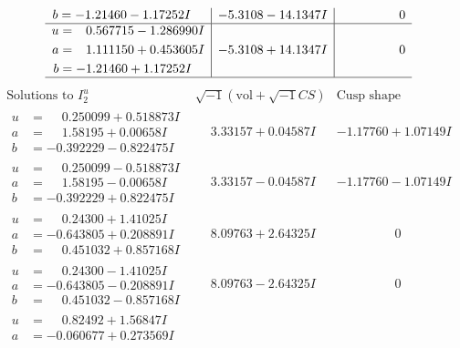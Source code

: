 \documentclass[1p]{elsarticle_modified}
\theoremstyle{definition}
\newcommand{\I}{\sqrt{-1}}
\begin{document}
$$\begin{array}{c|c|c}
\begin{aligned}
b &= -1.21460 - 1.17252 I\end{aligned}
 & -5.3108 - 14.1347 I & \phantom{-0.000000 } 0 \\ \hline\begin{aligned}
u &= \phantom{-}0.567715 - 1.286990 I \\
a &= \phantom{-}1.111150 + 0.453605 I \\
b &= -1.21460 + 1.17252 I\end{aligned}
 & -5.3108 + 14.1347 I & \phantom{-0.000000 } 0\\
 \hline 
 \end{array}$$\newpage$$\begin{array}{c|c|c}  
\text{Solutions to }I^u_{2}& \I (\text{vol} + \sqrt{-1}CS) & \text{Cusp shape}\\
 \hline 
\begin{aligned}
u &= \phantom{-}0.250099 + 0.518873 I \\
a &= \phantom{-}1.58195 + 0.00658 I \\
b &= -0.392229 - 0.822475 I\end{aligned}
 & \phantom{-}3.33157 + 0.04587 I & -1.17760 + 1.07149 I \\ \hline\begin{aligned}
u &= \phantom{-}0.250099 - 0.518873 I \\
a &= \phantom{-}1.58195 - 0.00658 I \\
b &= -0.392229 + 0.822475 I\end{aligned}
 & \phantom{-}3.33157 - 0.04587 I & -1.17760 - 1.07149 I \\ \hline\begin{aligned}
u &= \phantom{-}0.24300 + 1.41025 I \\
a &= -0.643805 + 0.208891 I \\
b &= \phantom{-}0.451032 + 0.857168 I\end{aligned}
 & \phantom{-}8.09763 + 2.64325 I & \phantom{-0.000000 } 0 \\ \hline\begin{aligned}
u &= \phantom{-}0.24300 - 1.41025 I \\
a &= -0.643805 - 0.208891 I \\
b &= \phantom{-}0.451032 - 0.857168 I\end{aligned}
 & \phantom{-}8.09763 - 2.64325 I & \phantom{-0.000000 } 0 \\ \hline\begin{aligned}
u &= \phantom{-}0.82492 + 1.56847 I \\
a &= -0.060677 + 0.273569 I \\

\end{aligned}
\end{array}$$
\end{document}
